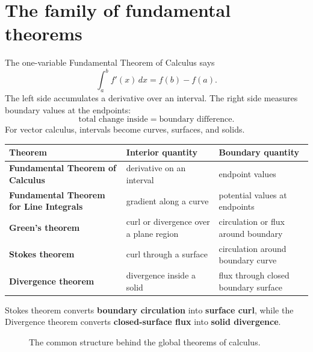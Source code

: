 \documentclass[11pt]{article}
\newcommand{\curl}{\nabla\times}
\newcommand{\diverg}{\nabla\cdot}
\newcommand{\vF}{\mathbf F}
\begin{document}
\section{The family of fundamental theorems}

The one-variable Fundamental Theorem of Calculus says
\[
\int_a^b f'(x)\,dx=f(b)-f(a).
\]
The left side accumulates a derivative over an interval. The right side measures boundary values at the endpoints:
\[
\text{total change inside}=\text{boundary difference}.
\]
For vector calculus, intervals become curves, surfaces, and solids.

\begin{center}
\begin{tabularx}{\textwidth}{>{\bfseries}lXX}
\toprule
Theorem & Interior quantity & Boundary quantity\\
\midrule
Fundamental Theorem of Calculus & derivative on an interval & endpoint values\\
Fundamental Theorem for Line Integrals & gradient along a curve & potential values at endpoints\\
Green's theorem & curl or divergence over a plane region & circulation or flux around boundary\\
Stokes theorem & curl through a surface & circulation around boundary curve\\
Divergence theorem & divergence inside a solid & flux through closed boundary surface\\
\bottomrule
\end{tabularx}
\end{center}

\begin{tipbox}
Stokes theorem converts \textbf{boundary circulation} into \textbf{surface curl}, while the Divergence theorem converts \textbf{closed-surface flux} into \textbf{solid divergence}.
\end{tipbox}

\begin{figure}[H]
\centering
{}
\caption{The common structure behind the global theorems of calculus.}
\end{figure}
\end{document}
